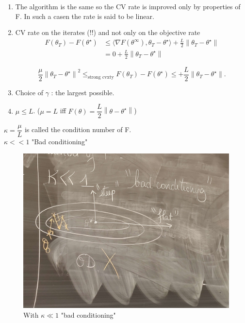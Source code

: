 \begin{note}
    \begin{enumerate}
        \item The algorithm is the same so the CV rate is improved only by properties of F. In such a casen the rate is said to be linear.
        \item CV rate on the iterates (!!) and not only on the objective rate 
        \begin{align*}
            F(\theta _T) - F(\theta ^\star ) 
            &\leq \langle \nabla F(\theta ^\infty ), \theta _T - \theta  ^\star \rangle  + \frac{L}{2} \left\| \theta _T  - \theta ^\star \right\| \\
            &= 0 + \frac{L}{2} \left\| \theta _T  - \theta ^\star \right\|
        \end{align*}
        
        \[
            \frac{\mu }{2} \left\| \theta _T - \theta ^\star  \right\| ^2 \leq_{\text{strong cvxty}}  F(\theta _T) - F(\theta ^\star ) \leq  + \frac{L}{2} \left\| \theta _T  - \theta ^\star \right\|
        .\]
        \item Choice of $\gamma$ : the largest possible.
        \item $\mu \leq L$. ($\mu = L$ iff $F(\theta)= \dfrac{L}{2}\left\| \theta - \theta ^ {\star} \right\| $)
    \end{enumerate}

    $\kappa = \dfrac{\mu}{L}$ is called the condition number of F. \\
    $\kappa << 1$ "Bad conditioning"
    \begin{figure}[!h]
        \centering
        \includegraphics[width=.75\textwidth]{figs/bad_kappa.jpg}
        \caption{With $ \kappa \ll 1 $ "bad conditioning" }
    \end{figure}


\end{note}
